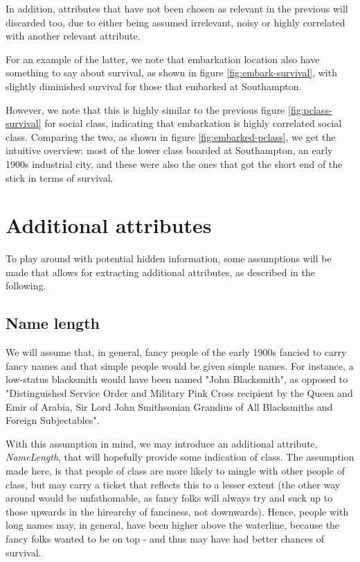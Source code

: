 \documentclass[11.5pt]{article}
\newcommand{\ti}[1] {\textit{#1}}
\begin{document}
In addition, attributes that have not been chosen as relevant in the previous will discarded too, due to either being assumed irrelevant, noisy or highly correlated with another relevant attribute. 

For an example of the latter, we note that embarkation location also have  something to say about survival, as shown in figure \ref{fig:embark-survival}, with slightly diminished survival for those that embarked at Southampton.


However, we note that this is highly similar to the previous figure \ref{fig:pclass-survival} for social class, indicating that embarkation is highly correlated social class. Comparing the two, as shown in figure  \ref{fig:embarked-pclass}, we get the intuitive overview: most of the lower class boarded at Southampton, an early 1900s industrial city, and these were also the ones that got the short end of the stick in terms of survival. 




\section{Additional attributes}

To play around with potential hidden information, some assumptions will be made that allows for extracting additional attributes, as described in the following. 

\subsection*{Name length}

We will assume that, in general, fancy people of the early 1900s fancied to carry fancy names and that simple people would be given simple names. For instance, a  low-status blacksmith would have been named "John Blacksmith", as opposed to "Distinguished Service Order and Military Pink Cross recipient by the Queen and Emir of Arabia, Sir Lord John Smithsonian Grandius of All Blacksmiths and Foreign Subjectables". 

With this assumption in mind, we may introduce an additional attribute, \ti{NameLength}, that will hopefully  provide some indication of class. The assumption made here, is that people of class are more likely to mingle with other people of class, but may carry a ticket that reflects this to a lesser extent (the other way around would be unfathomable, as fancy folks will always try and suck up to those upwards in the hirearchy of fanciness, not downwards). Hence, people with long names may, in general, have been higher above the waterline, because the fancy folks wanted to be on top - and thus  may have had better chances of survival. 
\end{document}
